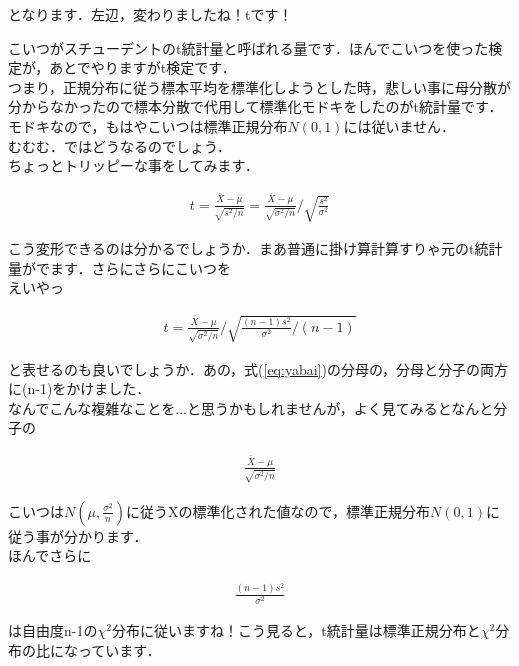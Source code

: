 \documentclass[11pt,a4paper,uplatex]{ujreport} 	%
\begin{document}
となります．左辺，変わりましたね！tです！

こいつがスチューデントのt統計量と呼ばれる量です．ほんでこいつを使った検定が，あとでやりますがt検定です．\\

つまり，正規分布に従う標本平均を標準化しようとした時，悲しい事に母分散が分からなかったので標本分散で代用して標準化モドキをしたのがt統計量です．\\

モドキなので，もはやこいつは標準正規分布$N(0,1)$には従いません．\\

むむむ．ではどうなるのでしょう．\\

ちょっとトリッピーな事をしてみます．

\begin{align}
  t = \frac{\bar{X}-\mu}{\sqrt{s^2/n}} = \frac{\bar{X}-\mu}{\sqrt{\sigma^2/n}} / \sqrt{\frac{s^2}{\sigma^2}}
  \label{eq:yabai}
\end{align}

こう変形できるのは分かるでしょうか．まあ普通に掛け算計算すりゃ元のt統計量がでます．さらにさらにこいつを\\

えいやっ

\begin{align}
  t = \frac{\bar{X}- \mu}{\sqrt{\sigma^2/n}} / \sqrt{\frac{(n-1)s^2}{\sigma^2}/(n-1)}
\end{align}

と表せるのも良いでしょうか．あの，式(\ref{eq:yabai})の分母の，分母と分子の両方に(n-1)をかけました．\\

なんでこんな複雑なことを...と思うかもしれませんが，よく見てみるとなんと分子の

\begin{align}
  \frac{\bar{X}- \mu}{\sqrt{\sigma^2/n}}
\end{align}

こいつは$N(\mu, \frac{\sigma^2}{n})$に従うXの標準化された値なので，標準正規分布$N(0,1)$に従う事が分かります．\\

ほんでさらに

\begin{align}
  \frac{(n-1)s^2}{\sigma^2}
\end{align}

は自由度n-1の$\chi^2$分布に従いますね！こう見ると，t統計量は標準正規分布と$\chi^2$分布の比になっています．\\
\end{document}
